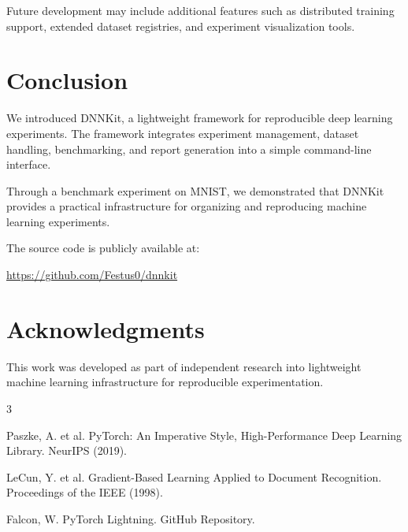 \documentclass{article}
\begin{document}
Future development may include additional features such as distributed training support,
extended dataset registries, and experiment visualization tools.

\section{Conclusion}

We introduced DNNKit, a lightweight framework for reproducible deep learning experiments.
The framework integrates experiment management, dataset handling, benchmarking,
and report generation into a simple command-line interface.

Through a benchmark experiment on MNIST, we demonstrated that DNNKit provides
a practical infrastructure for organizing and reproducing machine learning experiments.

The source code is publicly available at:

\begin{center}
\url{https://github.com/Festus0/dnnkit}
\end{center}

\section*{Acknowledgments}

This work was developed as part of independent research into lightweight machine learning
infrastructure for reproducible experimentation.



\begin{thebibliography}{3}

Paszke, A. et al.
PyTorch: An Imperative Style, High-Performance Deep Learning Library.
NeurIPS (2019).

LeCun, Y. et al.
Gradient-Based Learning Applied to Document Recognition.
Proceedings of the IEEE (1998).

Falcon, W.
PyTorch Lightning.
GitHub Repository.

\end{thebibliography}
\end{document}
